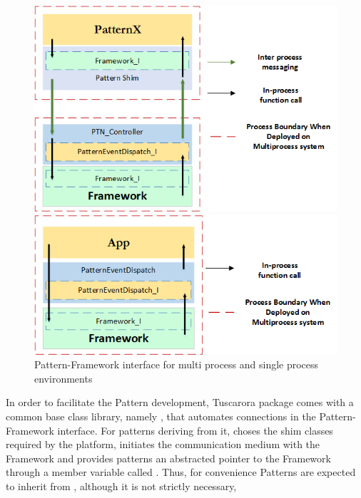 \begin{figure}[ht]
\centering
	  \begin{minipage}[b]{0.6\textwidth}
	    \includegraphics[width=\textwidth]{figures/Pattern_Framework_ShimArchitectureMP}
	  \end{minipage}
	  \begin{minipage}[b]{0.6\textwidth}
	    \includegraphics[width=\textwidth]{figures/Pattern_Framework_ShimArchitectureSP}
	  \end{minipage}
\caption{Pattern-Framework interface for multi process and single process environments}
\label{fig:PatternFrameworkInterface}
\end{figure}

In order to facilitate the Pattern development, Tuscarora package comes with a common base class library, namely , that automates connections in the Pattern-Framework interface. For patterns deriving from it,   choses the shim classes required by the platform, initiates the communication medium with the Framework and provides patterns an abstracted pointer to the Framework through a member variable called . Thus, for convenience Patterns are expected to inherit from , although it is not strictly necessary, 

